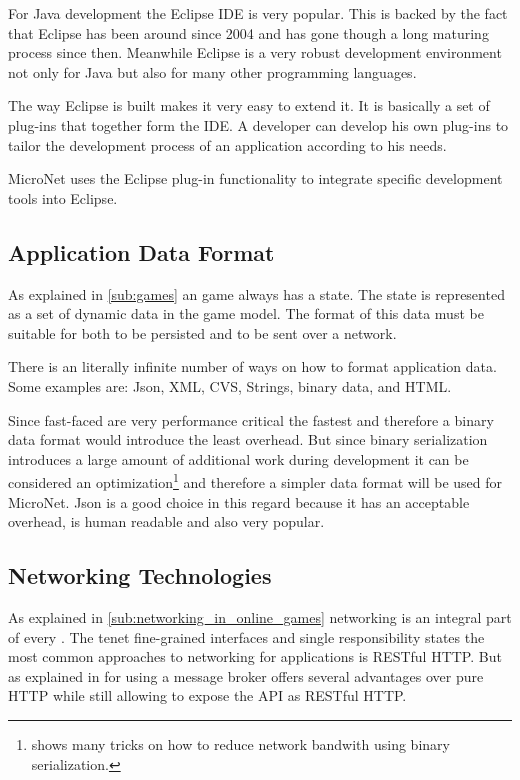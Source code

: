 For Java development the Eclipse IDE is very popular. This is backed by the fact
that Eclipse has been around since 2004 and has gone though a long
maturing process since then. Meanwhile Eclipse is a very robust development
environment not only for Java but also for many other programming languages.

The way Eclipse is built makes it very easy to extend it. It is basically a set
of plug-ins that together form the IDE. A developer can develop his own
plug-ins to tailor the development process of an application according to his
needs.

MicroNet uses the Eclipse plug-in functionality to integrate \ms{} specific
development tools into Eclipse.

\subsection{Application Data Format}

As explained in \autoref{sub:games} an \og{} game always has a state. The state
is represented as a set of dynamic data in the game model.
The format of this data must be suitable for both  to be persisted and to be
sent over a network.

There is an literally infinite number of ways on how to format application data.
Some examples are: Json, XML, CVS, Strings, binary data, and HTML.

Since fast-faced \ogs{} are very performance critical the fastest and therefore
a binary data format would introduce the least overhead. But since binary
serialization introduces a large amount of additional work during development it
can be considered an optimization\footnote{\cite{gafferon2017games} shows many
tricks on how to reduce \og{} network bandwith using binary serialization.} and
therefore a simpler data format will be used for MicroNet.
Json is a good choice in this regard because it has an acceptable overhead,
is human readable and also very popular.

\subsection{Networking Technologies}

As explained in \autoref{sub:networking_in_online_games} networking is an
integral part of every \og{}. The \ms{} tenet fine-grained interfaces and single
responsibility states the most common approaches to networking for \ms{}
applications is RESTful HTTP. But as explained in  for \ogs{} using a message broker offers several advantages over
pure HTTP while still allowing to expose the API as RESTful HTTP.

